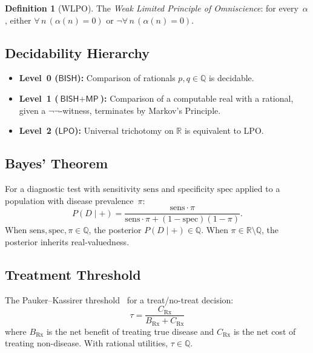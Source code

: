 \documentclass[11pt,a4paper]{article}
\theoremstyle{plain}
\theoremstyle{definition}
\newtheorem{definition}[theorem]{Definition}
\newcommand{\BISH}{\textsf{BISH}}
\newcommand{\LPO}{\textsf{LPO}}
\newcommand{\MP}{\textsf{MP}}
\newcommand{\Q}{\mathbb{Q}}
\newcommand{\R}{\mathbb{R}}
\begin{document}
\begin{definition}[WLPO]
The \emph{Weak Limited Principle of Omniscience}: for every~$\alpha$, either $\forall\, n\,(\alpha(n)=0)$ or $\lnot\forall\, n\,(\alpha(n)=0)$.
\end{definition}

\subsection{Decidability Hierarchy}

\begin{itemize}[nosep]
\item \textbf{Level~0 ($\BISH$):} Comparison of rationals $p, q \in \Q$ is decidable.
\item \textbf{Level~1 ($\BISH + \MP$):} Comparison of a computable real with a rational, given a $\lnot\lnot$-witness, terminates by Markov's Principle.
\item \textbf{Level~2 ($\LPO$):} Universal trichotomy on $\R$ is equivalent to LPO.
\end{itemize}

\subsection{Bayes' Theorem}

For a diagnostic test with sensitivity $\mathrm{sens}$ and specificity $\mathrm{spec}$ applied to a population with disease prevalence~$\pi$:
\begin{equation}\label{eq:bayes}
  P(D \mid +) = \frac{\mathrm{sens} \cdot \pi}{\mathrm{sens} \cdot \pi + (1 - \mathrm{spec})(1 - \pi)}.
\end{equation}
When $\mathrm{sens}, \mathrm{spec}, \pi \in \Q$, the posterior $P(D\mid +) \in \Q$.  When $\pi \in \R \setminus \Q$, the posterior inherits real-valuedness.

\subsection{Treatment Threshold}

The Pauker--Kassirer threshold~\cite{pauker-kassirer1980} for a treat/no-treat decision:
\begin{equation}\label{eq:threshold}
  \tau = \frac{C_{\mathrm{Rx}}}{B_{\mathrm{Rx}} + C_{\mathrm{Rx}}}
\end{equation}
where $B_{\mathrm{Rx}}$ is the net benefit of treating true disease and $C_{\mathrm{Rx}}$ is the net cost of treating non-disease.  With rational utilities, $\tau \in \Q$.
\end{document}
